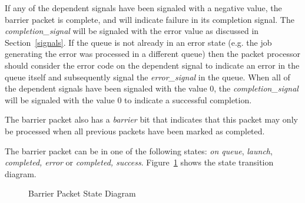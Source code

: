 \documentclass[draft]{book}
\newcommand{\reffld}[1]{\textit{#1}}
\begin{document}
If any of the dependent signals have been signaled with a negative value, the
barrier packet is complete, and will indicate failure in its completion
signal. The \reffld{completion_signal} will be signaled with the error value as
discussed in Section~\ref{signals}. If the queue is not already in an error
state (e.g. the job generating the error was processed in a different queue)
then the packet processor should consider the error code on the dependent signal
to indicate an error in the queue itself and subsequently signal the
\reffld{error_signal} in the queue. When all of the dependent signals have been
signaled with the value 0, the \reffld{completion_signal} will be signaled with
the value 0 to indicate a successful completion.

The barrier packet also has a \reffld{barrier} bit that indicates that this
packet may only be processed when all previous packets have been marked as
completed.

The barrier packet can be in one of the following states: \emph{on queue},
\emph{launch}, \emph{completed, error} or \emph{completed,
  success}. Figure~\ref{fig:barrierpacketstate} shows the state transition
diagram.
\begin{figure}
  \centering
  \scriptsize
    \caption{Barrier Packet State Diagram}
  \label{fig:barrierpacketstate}
\end{figure}
\end{document}
